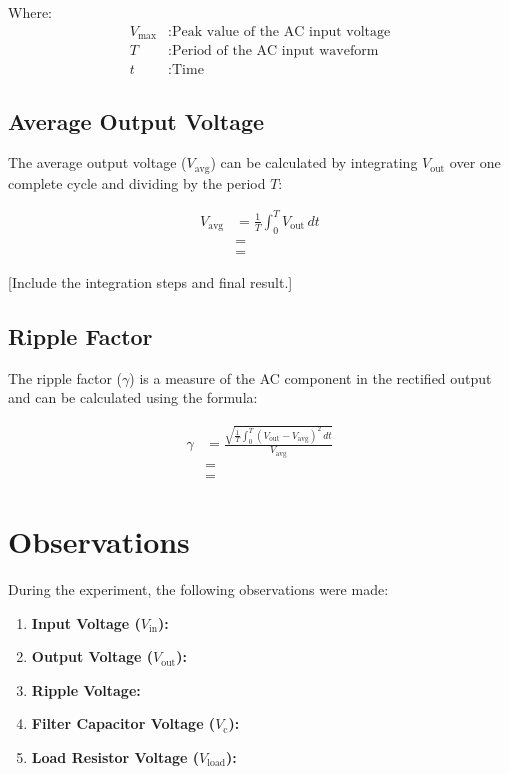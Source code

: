 \documentclass{article}
\begin{document}
Where:
\begin{align*}
    V_{\text{max}} & : \text{Peak value of the AC input voltage} \\
    T & : \text{Period of the AC input waveform} \\
    t & : \text{Time}
\end{align*}

\subsection*{Average Output Voltage}

The average output voltage (\(V_{\text{avg}}\)) can be calculated by integrating \(V_{\text{out}}\) over one complete cycle and dividing by the period \(T\):

\begin{align}
V_{\text{avg}} &= \frac{1}{T} \int_{0}^{T} V_{\text{out}} \, dt \nonumber\\ 
&= \nonumber \\
&=
\end{align}

[Include the integration steps and final result.]

\subsection*{Ripple Factor}

The ripple factor (\(\gamma\)) is a measure of the AC component in the rectified output and can be calculated using the formula:

\begin{align}
\gamma &= \frac{\sqrt{\frac{1}{T} \int_{0}^{T} (V_{\text{out}} - V_{\text{avg}})^2 \, dt}}{V_{\text{avg}}} \nonumber\\ 
&= \nonumber \\
&= 
\end{align}

\section*{Observations}
During the experiment, the following observations were made:

\begin{enumerate}
    \item \textbf{Input Voltage (\(V_{\text{in}}\)):} 

    \item \textbf{Output Voltage (\(V_{\text{out}}\)):} 

    \item \textbf{Ripple Voltage:} 

    \item \textbf{Filter Capacitor Voltage (\(V_{\text{c}}\)):} 

    \item \textbf{Load Resistor Voltage (\(V_{\text{load}}\)):} 

   
\end{enumerate}
\end{document}
